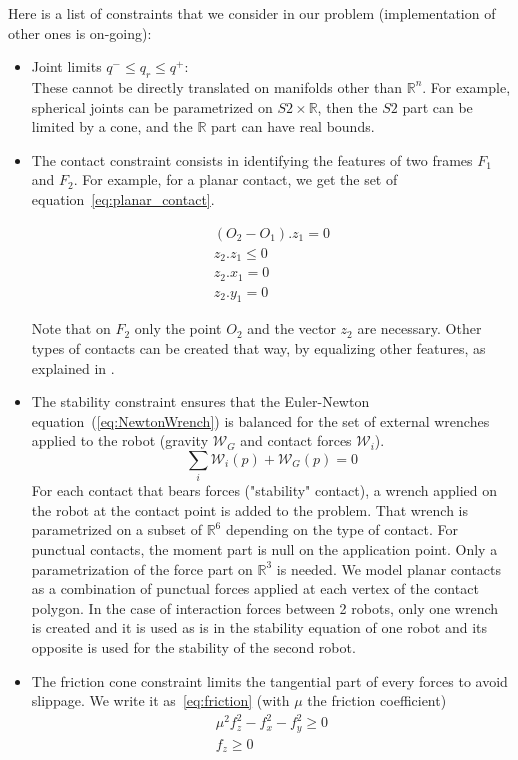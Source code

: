 Here is a list of constraints that we consider in our problem (implementation of other ones is on-going):
\begin{itemize}
\item Joint limits ${q^-} \leq q_r \leq {q^+}$:\\
These cannot be directly translated on manifolds other than $\mathbb{R}^n$. For example, spherical joints can be parametrized on $S2 \times \mathbb{R}$, then the $S2$ part can be limited by a cone, and the $\mathbb{R}$ part can have real bounds. 
\item The contact constraint consists in identifying the features of two frames $F_1$ and $F_2$. For example, for a planar contact, we get the set of equation~\ref{eq:planar_contact}.

\begin{equation}
  \begin{split}
    (O_2-O_1).z_1 = 0\\
    z_2.z_1 \leq 0 \\
    z_2.x_1 = 0 \\
    z_2.y_1 = 0
  \end{split}
  \label{eq:planar_contact}
\end{equation}

Note that on $F_2$ only the point $O_2$ and the vector $z_2$ are necessary.
Other types of contacts can be created that way, by equalizing other features, as explained in \cite{escande:ras:2013}.

\item The stability constraint ensures that the Euler-Newton equation~(\ref{eq:NewtonWrench}) is balanced for the set of external wrenches applied to the robot (gravity $\mathcal{W}_G$ and contact forces $\mathcal{W}_i$).
  \begin{equation}
    \sum_{i}{\mathcal{W}_i(p)} + {\mathcal{W}_G(p)} = 0
    \label{eq:NewtonWrench}
  \end{equation}
  For each contact that bears forces ("stability" contact), a wrench applied on the robot at the contact point is added to the problem.
  That wrench is parametrized on a subset of $\mathbb{R}^6$ depending on the type of contact.
  For punctual contacts, the moment part is null on the application point.
  Only a parametrization of the force part on $\mathbb{R}^3$ is needed.
  We model planar contacts as a combination of punctual forces applied at each vertex of the contact polygon.
  In the case of interaction forces between 2 robots, only one wrench is created and it is used as is in the stability equation of one robot and its opposite is used for the stability of the second robot.

\item The friction cone constraint limits the tangential part of every forces to avoid slippage. We write it as~\ref{eq:friction} (with $\mu$ the friction coefficient)
\begin{equation}
  \begin{split}
    \mu^2f_z^2-f_x^2-f_y^2 \geq 0 \\
    f_z \geq 0
  \end{split}
  \label{eq:friction}
\end{equation}
\end{itemize}

